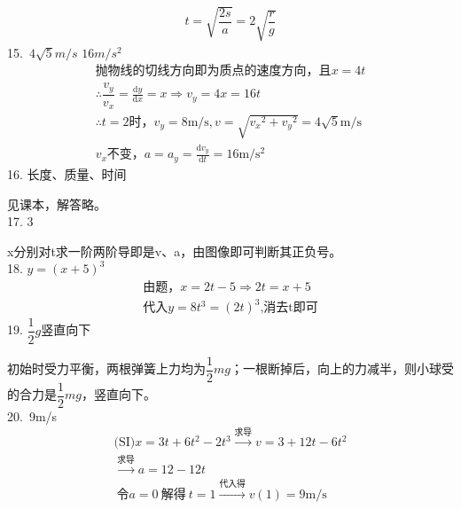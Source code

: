 \documentclass[blue, normal]{./templete/qyxfnote}
\newcommand{\di}[1]{\mathrm{d}#1}
\newcommand{\dy}[2]{\frac{\di{#1}}{\di{#2}}}
\begin{document}
\begin{multicols}{2}
\begin{gather*}
		t=\sqrt{\dfrac{2s}{a}}=2\sqrt{\dfrac{r}{g}}
		\end{gather*}
		15.\ $4\sqrt{5}m/s$ \qquad $16m/s^2 $ 
		\vspace{-1em}
		\begin{gather*}	
		\text{抛物线的切线方向即为质点的速度方向，且}x=4t\\
		\therefore \dfrac{v_y}{v_x}=\dy{y}{x}=x\Rightarrow v_y=4x=16t\\
		\therefore t=2\text{时，}v_y=8\mathrm{m/s},
		v=\sqrt{{v_x}^2+{v_y}^2}=4\sqrt{5}\mathrm{m/s}\\
		v_x\text{不变，}a=a_y=\dy{v_y}{t}=16\mathrm{m/s^2}
		\end{gather*}
		16. 长度、质量、时间\par
		见课本，解答略。\\
		17. 3\par
		x分别对t求一阶两阶导即是v、a，由图像即可判断其正负号。\\
		18. $y={(x+5)}^3$
		\vspace{-1em}
		\begin{gather*}\text{由题，}x=2t-5\Rightarrow 2t=x+5\\
		\text{代入}y=8t^3={(2t)}^3\text{,消去t即可}
		\end{gather*}	
		19. $\dfrac{1}{2}g$\qquad 竖直向下\par
		初始时受力平衡，两根弹簧上力均为$\dfrac{1}{2}mg$；一根断掉后，向上的力减半，则小球受的合力是$\dfrac{1}{2}mg$，竖直向下。\\
		20.\ 9m/s 
		\vspace{-1em}
		\begin{gather*}\text{(SI)} x=3t+6t^2-2t^3\xrightarrow{\text{求导}}v=3+12t-6t^2\\
		\xrightarrow{\text{求导}}a=12-12t\\\
		令a=0\ \text{解得}\ t=1\xrightarrow{\text{代入得}} v(1)=9\mathrm{m/s}
		\end{gather*}

\end{multicols}
\end{document}
